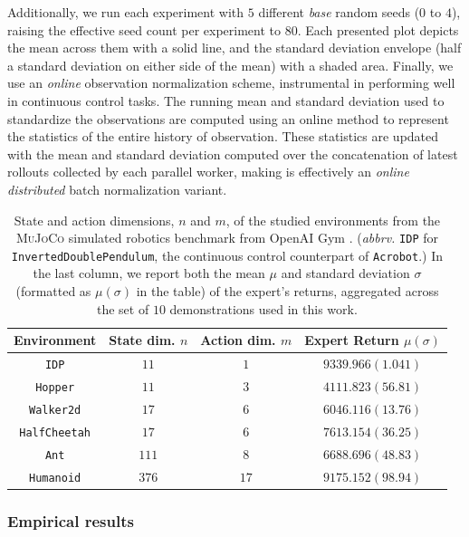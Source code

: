 Additionally, we run each experiment with $5$ different \textit{base} random seeds ($0$ to $4$),
raising the effective seed count per experiment to $80$.
Each presented plot depicts the mean across them with a solid line,
and the standard deviation envelope
(half a standard deviation on either side of the mean) with a shaded area.
Finally, we use an \emph{online} observation normalization scheme,
instrumental in performing well in continuous control tasks.
The running mean and standard deviation used to standardize the observations are
computed using an online method to represent the statistics of the entire history of observation.
These statistics are updated with the mean and standard deviation computed over
the concatenation of latest rollouts collected by each parallel worker,
making is effectively an \emph{online distributed}
batch normalization \cite{Ioffe2015-ls} variant.

\begin{table}
\centering
\begin{tabular}{c|cc|c}
\hline
Environment&State dim. $n$&Action dim. $m$&Expert Return $\mu(\sigma)$ \\
\hline
\rowcolor{MyLightGray}
\texttt{IDP}&$11$&$1$&$9339.966(1.041)$ \\
\texttt{Hopper}&$11$&$3$&$4111.823(56.81)$ \\
\rowcolor{MyLightGray}
\texttt{Walker2d}&$17$&$6$&$6046.116(13.76)$ \\
\texttt{HalfCheetah}&$17$&$6$&$7613.154(36.25)$ \\
\rowcolor{MyLightGray}
\texttt{Ant}&$111$&$8$&$6688.696(48.83)$ \\
\texttt{Humanoid}&$376$&$17$&$9175.152(98.94)$ \\
\hline
\end{tabular}
\caption{State and action dimensions, $n$ and $m$,
of the studied environments from the \textsc{MuJoCo}
\cite{Todorov2012-gc} simulated robotics benchmark from
OpenAI Gym \cite{Brockman2016-un}.
(\textit{abbrv.} \texttt{IDP} for \texttt{InvertedDoublePendulum}, the continuous control
counterpart of \texttt{Acrobot}.)
In the last column, we report both the mean $\mu$ and standard deviation $\sigma$
(formatted as $\mu(\sigma)$ in the table)
of the expert's returns, aggregated across the set of $10$ demonstrations used in this work.}
\label{envtable}
\end{table}

\subsubsection{Empirical results}

